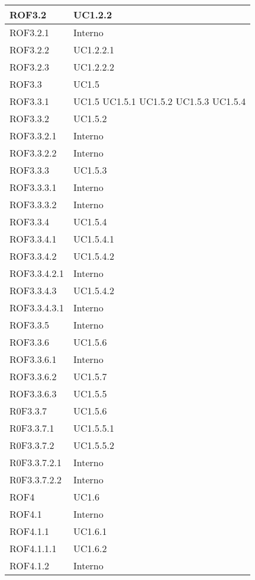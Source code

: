 \begin{center}
\begin{longtable}{| p{4cm} | p{4cm} |}
ROF3.2   &  UC1.2.2 \\
\hline
ROF3.2.1   &  Interno \\
\hline
ROF3.2.2   &  UC1.2.2.1 \\
\hline
ROF3.2.3   &  UC1.2.2.2 \\
\hline
ROF3.3   &  UC1.5 \\
\hline
ROF3.3.1   &  UC1.5 \newline UC1.5.1 \newline UC1.5.2 \newline UC1.5.3 \newline UC1.5.4 \\
\hline
ROF3.3.2   &  UC1.5.2 \\
\hline
ROF3.3.2.1   &  Interno \\
\hline
ROF3.3.2.2   &  Interno \\
\hline
ROF3.3.3   &  UC1.5.3 \\
\hline
ROF3.3.3.1   &  Interno \\
\hline
ROF3.3.3.2   &  Interno \\
\hline
ROF3.3.4   &  UC1.5.4 \\
\hline
ROF3.3.4.1   &  UC1.5.4.1 \\
\hline
ROF3.3.4.2   &  UC1.5.4.2 \\
\hline
ROF3.3.4.2.1   &  Interno \\
\hline
ROF3.3.4.3   &  UC1.5.4.2 \\
\hline
ROF3.3.4.3.1   &  Interno \\
\hline
ROF3.3.5   &  Interno \\
\hline
ROF3.3.6   &  UC1.5.6 \\
\hline
ROF3.3.6.1   &  Interno \\
\hline
ROF3.3.6.2   &  UC1.5.7 \\
\hline
ROF3.3.6.3   &  UC1.5.5 \\
\hline
R0F3.3.7   &  UC1.5.6 \\
\hline
R0F3.3.7.1   &  UC1.5.5.1 \\
\hline
R0F3.3.7.2   &  UC1.5.5.2 \\
\hline
R0F3.3.7.2.1   &  Interno \\
\hline
R0F3.3.7.2.2   &  Interno \\
\hline
ROF4   &  UC1.6 \\
\hline
ROF4.1   &  Interno \\
\hline
ROF4.1.1   &  UC1.6.1 \\
\hline
ROF4.1.1.1   &  UC1.6.2 \\
\hline
ROF4.1.2   &  Interno \\

\end{longtable}
\end{center}
